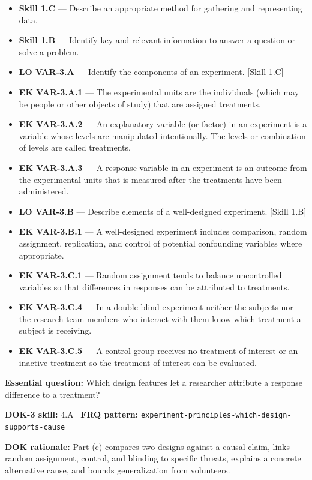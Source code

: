 \documentclass[11pt]{article}
\begin{document}


{\small
\begin{itemize}[leftmargin=1.5em,itemsep=2pt,topsep=2pt]
  \item \textbf{Skill 1.C} --- Describe an appropriate method for gathering and representing data.
  \item \textbf{Skill 1.B} --- Identify key and relevant information to answer a question or solve a problem.
  \item \textbf{LO VAR-3.A} --- Identify the components of an experiment. [Skill 1.C]
  \item \textbf{EK VAR-3.A.1} --- The experimental units are the individuals (which may be people or other objects of study) that are assigned treatments.
  \item \textbf{EK VAR-3.A.2} --- An explanatory variable (or factor) in an experiment is a variable whose levels are manipulated intentionally. The levels or combination of levels are called treatments.
  \item \textbf{EK VAR-3.A.3} --- A response variable in an experiment is an outcome from the experimental units that is measured after the treatments have been administered.
  \item \textbf{LO VAR-3.B} --- Describe elements of a well-designed experiment. [Skill 1.B]
  \item \textbf{EK VAR-3.B.1} --- A well-designed experiment includes comparison, random assignment, replication, and control of potential confounding variables where appropriate.
  \item \textbf{EK VAR-3.C.1} --- Random assignment tends to balance uncontrolled variables so that differences in responses can be attributed to treatments.
  \item \textbf{EK VAR-3.C.4} --- In a double-blind experiment neither the subjects nor the research team members who interact with them know which treatment a subject is receiving.
  \item \textbf{EK VAR-3.C.5} --- A control group receives no treatment of interest or an inactive treatment so the treatment of interest can be evaluated.
\end{itemize}
}
\textbf{Essential question:} Which design features let a researcher attribute a response difference to a treatment?\par
\textbf{DOK-3 skill:} 4.A \textperiodcentered\ \textbf{FRQ pattern:} {\small\texttt{experiment-\allowbreak{}principles-\allowbreak{}which-\allowbreak{}design-\allowbreak{}supports-\allowbreak{}cause}}\par
\textbf{DOK rationale:} Part (c) compares two designs against a causal claim, links random assignment, control, and blinding to specific threats, explains a concrete alternative cause, and bounds generalization from volunteers.\par
\end{document}
